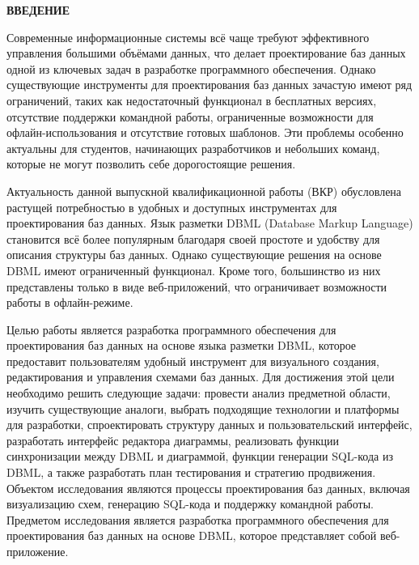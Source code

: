 \onehalfspacing
\setcounter{page}{5}

\newpage
\renewcommand{\contentsname}{\centerline{\large СОДЕРЖАНИЕ}}
\tableofcontents

\newpage
\begin{center}
  \textbf{\large ВВЕДЕНИЕ}
\end{center}


Современные информационные системы всё чаще требуют эффективного управления большими объёмами данных, что делает проектирование баз данных одной из ключевых задач в разработке программного обеспечения. Однако существующие инструменты для проектирования баз данных зачастую имеют ряд ограничений, таких как недостаточный функционал в бесплатных версиях, отсутствие поддержки командной работы, ограниченные возможности для офлайн-использования и отсутствие готовых шаблонов. Эти проблемы особенно актуальны для студентов, начинающих разработчиков и небольших команд, которые не могут позволить себе дорогостоящие решения.

Актуальность данной выпускной квалификационной работы (ВКР) обусловлена растущей потребностью в удобных и доступных инструментах для проектирования баз данных. Язык разметки DBML (Database Markup Language) становится всё более популярным благодаря своей простоте и удобству для описания структуры баз данных. Однако существующие решения на основе DBML имеют ограниченный функционал. Кроме того, большинство из них представлены только в виде веб-приложений, что ограничивает возможности работы в офлайн-режиме.

Целью работы является разработка программного обеспечения для проектирования баз данных на основе языка разметки DBML, которое предоставит пользователям удобный инструмент для визуального создания, редактирования и управления схемами баз данных. Для достижения этой цели необходимо решить следующие задачи: провести анализ предметной области, изучить существующие аналоги, выбрать подходящие технологии и платформы для разработки, спроектировать структуру данных и пользовательский интерфейс, разработать интерфейс редактора диаграммы, реализовать функции синхронизации между DBML и диаграммой, функции генерации SQL-кода из DBML, а также разработать план тестирования и стратегию продвижения. Объектом исследования являются процессы проектирования баз данных, включая визуализацию схем, генерацию SQL-кода и поддержку командной работы.
Предметом исследования является разработка программного обеспечения для проектирования баз данных на основе DBML, которое представляет собой веб-приложение.

